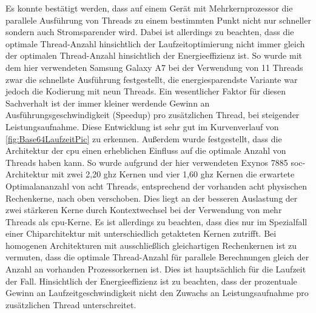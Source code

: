 Es konnte bestätigt werden, dass auf einem Gerät mit Mehrkernprozessor die parallele Ausführung von Threads zu einem bestimmten Punkt nicht nur schneller sondern auch Stromsparender wird. Dabei ist allerdings zu beachten, dass die optimale Thread-Anzahl hinsichtlich der Laufzeitoptimierung nicht immer gleich der optimalen Thread-Anzahl hinsichtlich der Energieeffizienz ist. So wurde mit dem hier verwendeten Samsung Galaxy A7 bei der Verwendung von 11 Threads zwar die schnellste Ausführung festgestellt, die energiesparendste Variante war jedoch die Kodierung mit neun Threads. Ein wesentlicher Faktor für diesen Sachverhalt ist der immer kleiner werdende Gewinn an Ausführungsgeschwindigkeit (Speedup) pro zusätzlichen  Thread, bei steigender Leistungsaufnahme. Diese Entwicklung ist sehr gut im Kurvenverlauf von \autoref{fig:Base64LaufzeitPic} zu erkennen. Außerdem wurde festgestellt, dass die Architektur der \ac{cpu} einen erheblichen Einfluss auf die optimale Anzahl von Threads  haben kann. So wurde aufgrund der hier verwendeten Exynos 7885 \ac{soc}-Architektur mit zwei 2,20 \ac{ghz} Kernen und vier 1,60 \ac{ghz} Kernen die erwartete Optimalananzahl von acht Threads, entsprechend der vorhanden acht physischen Rechenkerne, nach oben verschoben. Dies liegt an der besseren Auslastung der zwei stärkeren Kerne durch Kontextwechsel bei der Verwendung von mehr Threads als \ac{cpu}-Kerne. Es ist allerdings zu beachten, dass dies nur im Spezialfall einer Chiparchitektur mit unterschiedlich getakteten Kernen zutrifft. Bei homogenen Architekturen mit ausschließlich gleichartigen Rechenkernen ist zu vermuten, dass die optimale Thread-Anzahl für parallele Berechnungen gleich der Anzahl an vorhanden Prozessorkernen ist. Dies ist hauptsächlich für die Laufzeit der Fall. Hinsichtlich der Energieeffizienz ist zu beachten, dass der prozentuale Gewinn an Laufzeitgeschwindigkeit nicht den Zuwachs an Leistungsaufnahme pro zusätzlichen Thread unterschreitet.